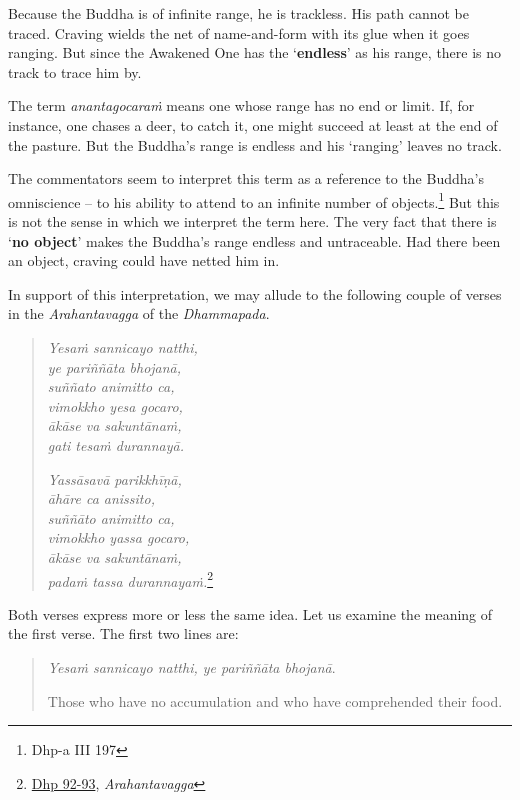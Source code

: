 Because the Buddha is of infinite range, he is trackless. His path cannot be traced. Craving wields the net of name-and-form with its glue when it goes ranging. But since the Awakened One has the `\textbf{endless}' as his range, there is no track to trace him by.

The term \emph{anantagocaraṁ} means one whose range has no end or limit. If, for instance, one chases a deer, to catch it, one might succeed at least at the end of the pasture. But the Buddha's range is endless and his `ranging' leaves no track.

The commentators seem to interpret this term as a reference to the Buddha's omniscience -- to his ability to attend to an infinite number of objects.\footnote{Dhp-a III 197} But this is not the sense in which we interpret the term here. The very fact that there is `\textbf{no object}' makes the Buddha's range endless and untraceable. Had there been an object, craving could have netted him in.

In support of this interpretation, we may allude to the following couple of verses in the \emph{Arahantavagga} of the \emph{Dhammapada}.

\begin{quote}
\emph{Yesaṁ sannicayo natthi,}\\
\emph{ye pariññāta bhojanā,}\\
\emph{suññato animitto ca,}\\
\emph{vimokkho yesa gocaro,}\\
\emph{ākāse va sakuntānaṁ,}\\
\emph{gati tesaṁ durannayā.}

\emph{Yassāsavā parikkhīṇā,}\\
\emph{āhāre ca anissito,}\\
\emph{suññāto animitto ca,}\\
\emph{vimokkho yassa gocaro,}\\
\emph{ākāse va sakuntānaṁ,}\\
\emph{padaṁ tassa durannayaṁ.}\footnote{\href{https://suttacentral.net/dhp90-99/pli/ms}{Dhp 92-93}, \emph{Arahantavagga}}
\end{quote}

Both verses express more or less the same idea. Let us examine the meaning of the first verse. The first two lines are:

\begin{quote}
\emph{Yesaṁ sannicayo natthi, ye pariññāta bhojanā}.

Those who have no accumulation and who have comprehended their food.
\end{quote}

